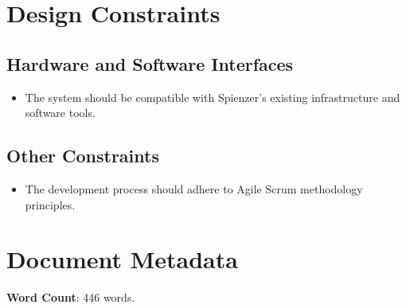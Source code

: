 \documentclass[12pt]{article}
\begin{document}
\section{Design Constraints}

\subsection{Hardware and Software Interfaces}
\begin{itemize}
    \item The system should be compatible with Spienzer's existing infrastructure and software tools.
\end{itemize}

\subsection{Other Constraints}
\begin{itemize}
    \item The development process should adhere to Agile Scrum methodology principles.
\end{itemize}

\newpage %
\section*{Document Metadata}
\textbf{Word Count}: 446 words.
\end{document}
